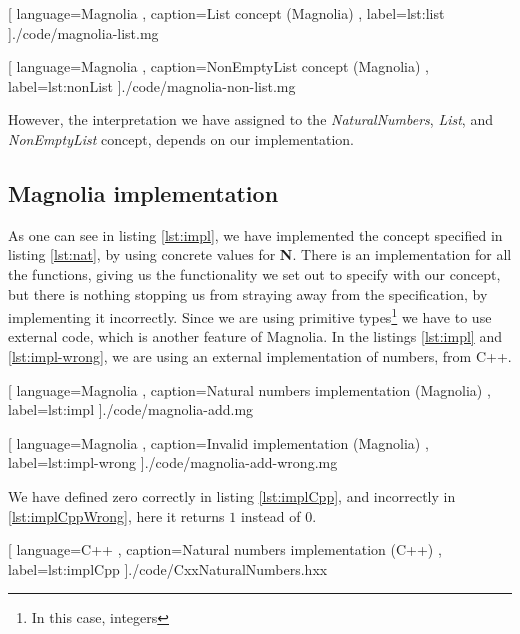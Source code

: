 \begin{center}
  
    [ language=Magnolia
    , caption={List concept (Magnolia)}
    , label=lst:list
    ]{./code/magnolia-list.mg}
\end{center}

\begin{center}
  
    [ language=Magnolia
    , caption={NonEmptyList concept (Magnolia)}
    , label=lst:nonList
    ]{./code/magnolia-non-list.mg}
\end{center}

However, the interpretation we have assigned to the \textit{NaturalNumbers},
\textit{List}, and \textit{NonEmptyList} concept, depends on our implementation.

\subsection{Magnolia implementation}

As one can see in listing \ref{lst:impl}, we have implemented the concept
specified in listing \ref{lst:nat}, by using concrete values for \textbf{N}.
There is an implementation for all the functions, giving us the functionality we
set out to specify with our concept, but there is nothing stopping us from
straying away from the specification, by implementing it incorrectly. Since we
are using primitive types\footnote{In this case, integers} we have to use
external code, which is another feature of Magnolia. In the listings
\ref{lst:impl} and \ref{lst:impl-wrong}, we are using an external implementation
of numbers, from C++.

\begin{code}[H]
  
    [ language=Magnolia
    , caption={Natural numbers implementation (Magnolia)}
    , label=lst:impl
    ]{./code/magnolia-add.mg}
\end{code}

\begin{code}[H]
  
    [ language=Magnolia
    , caption={Invalid implementation (Magnolia)}
    , label=lst:impl-wrong
    ]{./code/magnolia-add-wrong.mg}
\end{code}

We have defined zero correctly in listing \ref{lst:implCpp}, and incorrectly in
\ref{lst:implCppWrong}, here it returns $1$ instead of $0$.

\begin{code}[H]
  
    [ language=C++
    , caption={Natural numbers implementation (C++)}
    , label=lst:implCpp
    ]{./code/CxxNaturalNumbers.hxx}
\end{code}


